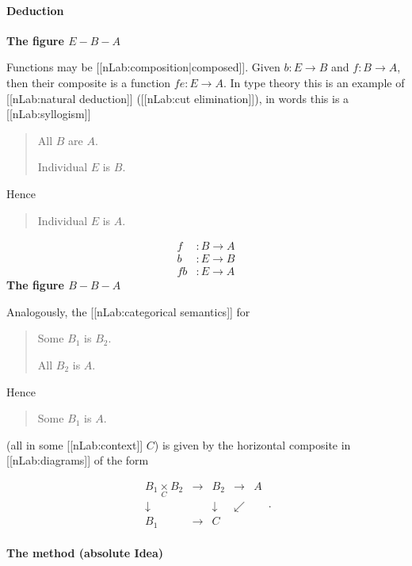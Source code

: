 \documentclass[12pt,titlepage]{article}
\newcommand{\itexarray}[1]{\begin{matrix}#1\end{matrix}}
\theoremstyle{plain}
\theoremstyle{definition}
\theoremstyle{remark}
\begin{document}
\hypertarget{deduction}{}\paragraph*{{Deduction}}\label{deduction}

\textbf{The figure $E-B-A$}

Functions may be [[nLab:composition|composed]]. Given $b \colon E \to B$ and $f \colon B \to A$, then their composite is a function $f e \colon E \to A$. In type theory this is an example of [[nLab:natural deduction]] ([[nLab:cut elimination]]), in words this is a [[nLab:syllogism]]

\begin{quote}%
All $B$ are $A$.

Individual $E$ is $B$.


\end{quote}
Hence

\begin{quote}%
Individual $E$ is $A$.


\end{quote}
\begin{displaymath}
\begin{aligned}
    f & \colon B \longrightarrow A
    \\
    b & \colon E \longrightarrow B
    \\
    f b & \colon E \longrightarrow A
  \end{aligned}
\end{displaymath}
\textbf{The figure $B-B-A$}

Analogously, the [[nLab:categorical semantics]] for

\begin{quote}%
Some $B_1$ is $B_2$.

All $B_2$ is $A$.


\end{quote}
Hence

\begin{quote}%
Some $B_1$ is $A$.


\end{quote}
(all in some [[nLab:context]] $C$) is given by the horizontal composite in [[nLab:diagrams]] of the form

\begin{displaymath}
\itexarray{
     B_1 \underset{C}{\times} B_2 &\longrightarrow& B_2 &\longrightarrow& A
     \\
     \downarrow && \downarrow & \swarrow
     \\
     B_1 &\longrightarrow& C
  }
  \,.
\end{displaymath}
\hypertarget{the_method_absolute_idea}{}\paragraph*{{The method (absolute Idea)}}\label{the_method_absolute_idea}
\end{document}
